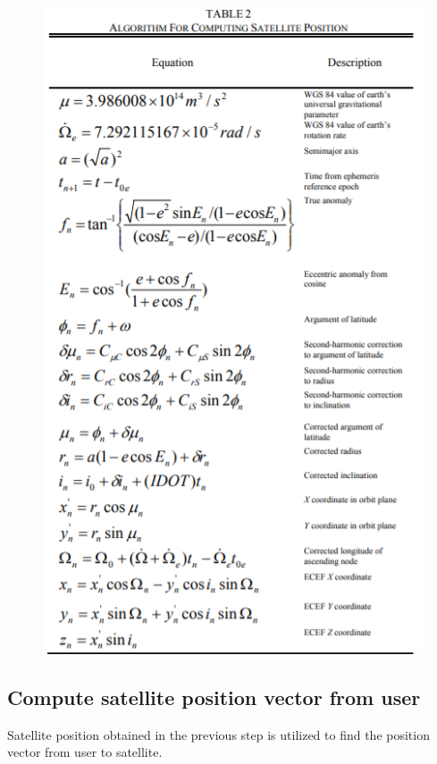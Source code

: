 \documentclass[conference,compsoc]{IEEEtran}
\begin{document}
\begin{figure}[!h]
	\centering
	\includegraphics[scale = 0.5]{images/table2.png}
	\caption{}
\end{figure}
\subsection{Compute satellite position vector from user}
Satellite position obtained in the previous step is utilized to find the position vector from user to satellite.
\end{document}
